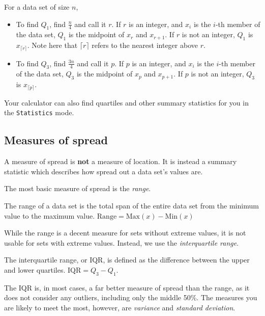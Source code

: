For a data set of size $n$,
\begin{itemize}
    \item To find $Q_1$, find $\frac{n}{4}$ and call it $r$. If $r$ is an integer, and $x_i$ is the $i$-th member of the data set, $Q_1$ is the midpoint of $x_r$ and $x_{r+1}$. If $r$ is not an integer, $Q_1$ is $x_{\lceil r \rceil}$. Note here that $\lceil r \rceil$ refers to the nearest integer above $r$.
    \item To find $Q_3$, find $\frac{3n}{4}$ and call it $p$. If $p$ is an integer, and $x_i$ is the $i$-th member of the data set, $Q_3$ is the midpoint of $x_p$ and $x_{p+1}$. If $p$ is not an integer, $Q_3$ is $x_{\lceil p \rceil}$.
\end{itemize}

Your calculator can also find quartiles and other summary statistics for you in the \texttt{Statistics} mode.

\subsection{Measures of spread}

A measure of spread is \textbf{not} a measure of location. It is instead a summary statistic which describes how spread out a data set's values are.

The most basic measure of spread is the \textit{range}.
\begin{tcolorbox}
    \begin{definition}[Range]
        The range of a data set is the total span of the entire data set from the minimum value to the maximum value. $\mathrm{Range}= \mathrm{Max}(x)-\mathrm{Min}(x)$
    \end{definition}
\end{tcolorbox}

While the range is a decent measure for sets without extreme values, it is not usable for sets with extreme values. Instead, we use the \textit{interquartile range}.

\begin{tcolorbox}
    \begin{definition}
        The interquartile range, or IQR, is defined as the difference between the upper and lower quartiles. $\mathrm{IQR}=Q_3 - Q_1$.
    \end{definition}
\end{tcolorbox}

The IQR is, in most cases, a far better measure of spread than the range, as it does not consider any outliers, including only the middle 50\%. The measures you are likely to meet the most, however, are \textit{variance} and \textit{standard deviation}.

